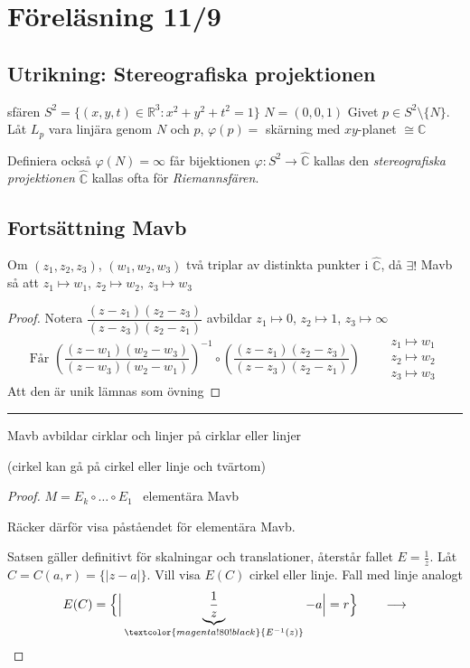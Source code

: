 \section{Föreläsning 11/9}

\subsection{Utrikning: Stereografiska projektionen}
sfären $S^2 = \{(x, y, t) \in \mathbb{R}^3 : x^2 + y^2 + t^2 = 1\}$
$N = (0, 0, 1)$ \quad Givet $p \in S^2 \setminus \{N\}$. Låt $L_p$ vara linjära genom $N$ och $p$, $\varphi(p) =$ skärning med $xy$-planet $\cong \mathbb{C}$

Definiera också $\varphi(N) = \infty$ får bijektionen $\varphi : S^2 \to \hat{\mathbb{C}}$ kallas den \emph{stereografiska projektionen}
$\hat{\mathbb{C}}$ kallas ofta för \emph{Riemannsfären}.

\subsection{Fortsättning Mavb}
\begin{theorem}[Kor 3.13]
Om $(z_1, z_2, z_3)$, $(w_1, w_2, w_3)$ två triplar av distinkta punkter i $\hat{\mathbb{C}}$, då $\exists!$ Mavb så att $z_1 \mapsto w_1$, $z_2 \mapsto w_2$, $z_3 \mapsto w_3$
\end{theorem}
\begin{proof}
Notera $\dfrac{(z - z_1)(z_2 - z_3)}{(z - z_3)(z_2 - z_1)}$ avbildar $z_1 \mapsto 0$, $z_2 \mapsto 1$, $z_3 \mapsto \infty$
\[ \text{Får } \left( \frac{(z - w_1)(w_2 - w_3)}{(z - w_3)(w_2 - w_1)} \right)^{-1} \circ \left( \frac{(z - z_1)(z_2 - z_3)}{(z - z_3)(z_2 - z_1)} \right) \qquad \begin{array}{l} z_1 \mapsto w_1 \\ z_2 \mapsto w_2 \\ z_3 \mapsto w_3 \end{array} \]
\textcolor{magenta!80!black}{Att den är unik lämnas som övning}
\end{proof}

\noindent\rule{\linewidth}{0.4pt}

\begin{theorem}[Sats 3.4]
Mavb avbildar cirklar och linjer på cirklar eller linjer

(cirkel kan gå på cirkel eller linje och tvärtom)
\end{theorem}
\begin{proof}
$M = E_k \circ \dots \circ E_1$ \ \textcolor{magenta!80!black}{elementära Mavb}

Räcker därför visa påståendet för elementära Mavb.

Satsen gäller definitivt för skalningar och translationer, återstår fallet $E = \frac{1}{z}$. Låt $C = C(a, r) = \{|z - a|\}$. Vill visa $E(C)$ cirkel eller linje. \textcolor{magenta!80!black}{Fall med linje analogt}
\[ E(C) = \Big\{ \Big| \underbrace{\frac{1}{z}}_{\textcolor{magenta!80!black}{E^{-1}(z)}} - a \Big| = r \Big\} \qquad \longrightarrow \]
\end{proof}

